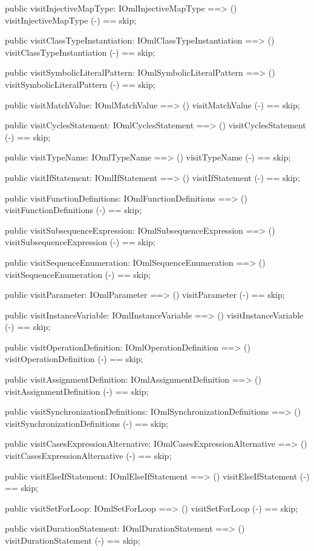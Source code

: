 \begin{vdm_al}
  public visitInjectiveMapType: IOmlInjectiveMapType ==> ()
  visitInjectiveMapType (-) == skip;

  public visitClassTypeInstantiation: IOmlClassTypeInstantiation ==> ()
  visitClassTypeInstantiation (-) == skip;

  public visitSymbolicLiteralPattern: IOmlSymbolicLiteralPattern ==> ()
  visitSymbolicLiteralPattern (-) == skip;

  public visitMatchValue: IOmlMatchValue ==> ()
  visitMatchValue (-) == skip;

  public visitCyclesStatement: IOmlCyclesStatement ==> ()
  visitCyclesStatement (-) == skip;

  public visitTypeName: IOmlTypeName ==> ()
  visitTypeName (-) == skip;

  public visitIfStatement: IOmlIfStatement ==> ()
  visitIfStatement (-) == skip;

  public visitFunctionDefinitions: IOmlFunctionDefinitions ==> ()
  visitFunctionDefinitions (-) == skip;

  public visitSubsequenceExpression: IOmlSubsequenceExpression ==> ()
  visitSubsequenceExpression (-) == skip;

  public visitSequenceEnumeration: IOmlSequenceEnumeration ==> ()
  visitSequenceEnumeration (-) == skip;

  public visitParameter: IOmlParameter ==> ()
  visitParameter (-) == skip;

  public visitInstanceVariable: IOmlInstanceVariable ==> ()
  visitInstanceVariable (-) == skip;

  public visitOperationDefinition: IOmlOperationDefinition ==> ()
  visitOperationDefinition (-) == skip;

  public visitAssignmentDefinition: IOmlAssignmentDefinition ==> ()
  visitAssignmentDefinition (-) == skip;

  public visitSynchronizationDefinitions: IOmlSynchronizationDefinitions ==> ()
  visitSynchronizationDefinitions (-) == skip;

  public visitCasesExpressionAlternative: IOmlCasesExpressionAlternative ==> ()
  visitCasesExpressionAlternative (-) == skip;

  public visitElseIfStatement: IOmlElseIfStatement ==> ()
  visitElseIfStatement (-) == skip;

  public visitSetForLoop: IOmlSetForLoop ==> ()
  visitSetForLoop (-) == skip;

  public visitDurationStatement: IOmlDurationStatement ==> ()
  visitDurationStatement (-) == skip;


\end{vdm_al}
